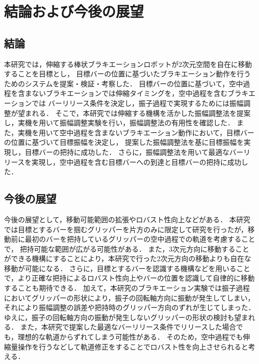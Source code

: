 \chapter[結論および今後の展望]%
{結論および今後の展望}
        \section{結論}

        本研究では，伸縮する棒状ブラキエーションロボットが2次元空間を自在に移動することを目標とし，
        目標バーの位置に基づいたブラキエーション動作を行うためのシステムを提案・検証・考察した．
        目標バーの位置に基づいて，空中過程を含まないブラキエーションでは伸縮タイミングを，空中過程を含むブラキエーションでは
        バーリリース条件を決定し，振子過程で実現するためには振幅調整が望まれる．
        そこで，本研究では伸縮する機構を活かした振幅調整法を提案し，実機を用いて振幅調整実験を行い，振幅調整法の有用性を確認した．
        また，実機を用いて空中過程を含まないブラキエーション動作において，目標バーの位置に基づいて目標振幅を決定し，
        提案した振幅調整法を基に目標振幅を実現し，目標バーの把持に成功した．
        さらに，振幅調整法を用いて最適なバーリリースを実現し，空中過程を含む目標バーへの到達と目標バーの把持に成功した．
       

          

        \section{今後の展望}
        
        今後の展望として，移動可能範囲の拡張やロバスト性向上などがある．
        本研究では目標とするバーを掴むグリッパーを片方のみに限定して研究を行ったが，移動前に最初のバーを把持しているグリッパーの空中過程での軌道を考慮することで，
        把持可能な範囲が広がる可能性がある．
        また，3次元方向に移動することができる機構にすることにより，本研究で行った2次元方向の移動よりも自在な移動が可能になる．
        さらに，目標とするバーを認識する機構などを用いることで，より正確な把持によるロバスト性向上やバーの位置を認識して自律的に移動することも期待できる．
        加えて，本研究のブラキエーション実験では振子過程においてグリッパーの形状により，振子の回転軸方向に振動が発生してしまい，
        それにより振幅調整の誤差や把持時のグリッパー方向のずれが生じてしまった．
        ゆえに，振子の回転軸方向の振動が発生しないグリッパーの形状の検討も望まれる．
        また，本研究で提案した最適なバーリリース条件でリリースした場合でも，理想的な軌道からずれてしまう可能性がある．
        そのため，空中過程でも伸縮量操作を行うなどして軌道修正をすることでロバスト性を向上させられると考える．
